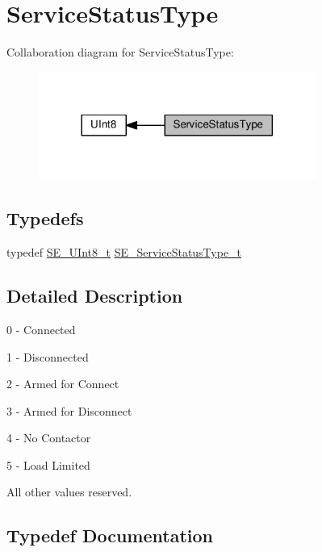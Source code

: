 \hypertarget{group__ServiceStatusType}{}\section{Service\+Status\+Type}
\label{group__ServiceStatusType}
Collaboration diagram for Service\+Status\+Type\+:\nopagebreak
\begin{figure}[H]
\begin{center}
\leavevmode
\includegraphics[width=257pt]{group__ServiceStatusType}
\end{center}
\end{figure}
\subsection*{Typedefs}
\begin{DoxyCompactItemize}
\item 
typedef \hyperlink{group__UInt8_gaf7c365a1acfe204e3a67c16ed44572f5}{S\+E\+\_\+\+U\+Int8\+\_\+t} \hyperlink{group__ServiceStatusType_gaa3cd725afc87388d65acf81254caee7d}{S\+E\+\_\+\+Service\+Status\+Type\+\_\+t}
\end{DoxyCompactItemize}


\subsection{Detailed Description}
0 -\/ Connected

1 -\/ Disconnected

2 -\/ Armed for Connect

3 -\/ Armed for Disconnect

4 -\/ No Contactor

5 -\/ Load Limited

All other values reserved. 

\subsection{Typedef Documentation}
\mbox{\label{group__ServiceStatusType_gaa3cd725afc87388d65acf81254caee7d}} 
